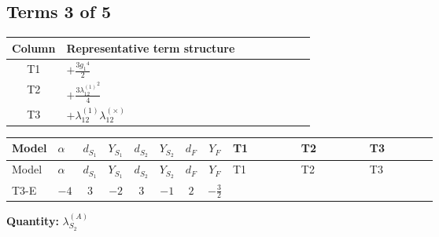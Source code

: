 \documentclass[8pt]{article}
\begin{document}
\begin{landscape}
\subsection*{Terms 3 of 5}
\begin{center}
\begin{tabular}{@{}c >{\raggedright\arraybackslash}p{0.82\linewidth}@{}}
\toprule
Column & Representative term structure \\
\midrule
T1 & \(\displaystyle +\frac{3 {g_1}^4}{2}\) \\
\midrule
T2 & \(\displaystyle +\frac{3 {\lambda_{12}^{(1)}}^2}{4}\) \\
\midrule
T3 & \(\displaystyle +{\lambda_{12}^{(1)}} {\lambda_{12}^{(\times)}}\) \\
\midrule
\bottomrule
\end{tabular}
\end{center}
\smallskip
\tiny
\begin{longtable}{@{}llcccccc >{\raggedright\arraybackslash}p{0.21\linewidth} >{\raggedright\arraybackslash}p{0.21\linewidth} >{\raggedright\arraybackslash}p{0.21\linewidth}@{}}
\toprule
Model & $\alpha$ & $d_{S_1}$ & $Y_{S_1}$ & $d_{S_2}$ & $Y_{S_2}$ & $d_F$ & $Y_F$ & T1 & T2 & T3 \\
\midrule
\endfirsthead
\toprule
Model & $\alpha$ & $d_{S_1}$ & $Y_{S_1}$ & $d_{S_2}$ & $Y_{S_2}$ & $d_F$ & $Y_F$ & T1 & T2 & T3 \\
\midrule
\endhead
T3-E & $-4$ & $3$ & $-2$ & $3$ & $-1$ & $2$ & $-\frac{3}{2}$ & \scriptsize\adjustbox{max width=\linewidth}{$\begin{gathered} +\frac{3 {g_1}^4}{2}\end{gathered}$} & \scriptsize\adjustbox{max width=\linewidth}{$\begin{gathered} +\frac{3 {\lambda_{12}^{(1)}}^2}{4}\end{gathered}$} & \scriptsize\adjustbox{max width=\linewidth}{$\begin{gathered} +{\lambda_{12}^{(1)}} {\lambda_{12}^{(\times)}}\end{gathered}$} \\
\midrule
\bottomrule
\end{longtable}
\clearpage
\noindent\textbf{Quantity: }$\lambda_{S_2}^{(A)}$\par\smallskip

\end{landscape}
\end{document}
